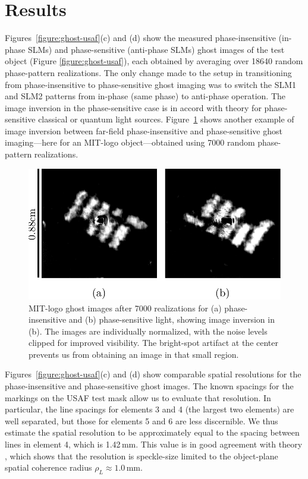\section{Results}

Figures~\ref{figure:ghost-usaf}(c) and (d) show the measured phase-insensitive (in-phase SLMs) and phase-sensitive (anti-phase SLMs) ghost images of the test object (Figure \ref{figure:ghost-usaf}), each obtained by averaging over 18640 random phase-pattern realizations. The only change made to the setup in transitioning from phase-insensitive to phase-sensitive ghost imaging was to switch the SLM1 and SLM2 patterns from in-phase (same phase) to anti-phase operation. The image inversion in the phase-sensitive case is in accord with theory \cite{erkmen-unified,erkmen-from} for phase-sensitive classical or quantum light sources.  Figure~\ref{figure:ghost-mitlogo} shows another example of image inversion between far-field phase-insensitive and phase-sensitive ghost imaging---here for an MIT-logo object---obtained using 7000 random phase-pattern realizations.

\begin{figure}[htb]
\centerline{\includegraphics[width=12cm]{figure-ghost-mitlogo.pdf}}
\caption{MIT-logo ghost images after 7000 realizations for (a) 
phase-insensitive and (b) phase-sensitive light, showing image inversion in (b). The images are individually normalized, with the noise levels clipped for improved visibility. The bright-spot artifact at the center prevents us from obtaining an image in that small region.}
\label{figure:ghost-mitlogo}
\end{figure}

Figures~\ref{figure:ghost-usaf}(c) and (d) show comparable spatial resolutions for the phase-insensitive and phase-sensitive ghost images. The known spacings for the markings on the USAF test mask allow us to evaluate that resolution. In particular, the line spacings for elements 3 and 4 (the largest two elements) are well separated, but those for elements 5 and 6 are less discernible. We thus estimate the spatial resolution to be approximately equal to the spacing between lines in element 4, which is 1.42\,mm. This value is in good agreement with theory \cite{erkmen-unified}, which shows that the resolution is speckle-size limited to the object-plane spatial coherence radius $\rho_L \approx 1.0$\,mm.

